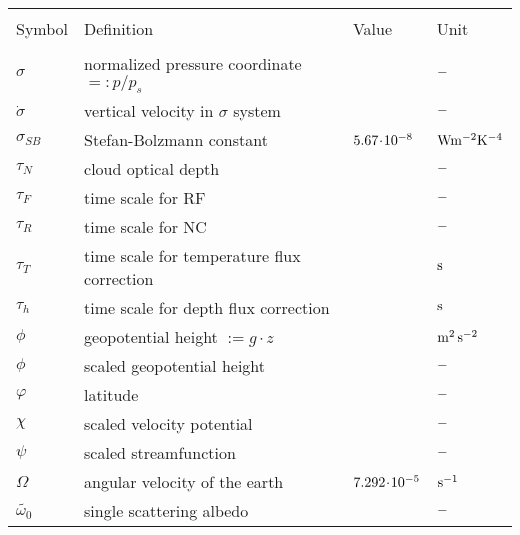 \begin{tabular*}{\textwidth}{|l@{\extracolsep\fill}lll|}
\hline
\vspace{-3mm} & & & \\
Symbol         & Definition                       & Value   & Unit \\
\hline 
\vspace{-3mm} & & & \\
$\sigma$  & normalized pressure coordinate $=: p/p_s$       &         & $\rm -$ \\
$\dot{\sigma}$  & vertical velocity in $\sigma$ system           &         & $\rm -$ \\
$\sigma_{SB}$ & Stefan-Bolzmann constant & $ 5.67 \! \cdot \! 10^{-8}$ &$\rm W m^{-2}K^{-4}$ \\
$\tau_N$  & cloud optical depth    &    &$\rm  -$\\
$\tau_{F}$     & time scale for RF                     &         & $\rm -$ \\
$\tau_{R}$     & time scale for NC                     &         & $\rm -$ \\
$\tau_{T}$     & time scale for temperature flux correction      &         & $\rm s$ \\
$\tau_{h}$     & time scale for depth flux correction            &         & $\rm s$ \\

$\phi$         & geopotential height $:=g\cdot{z}$          &         & $\rm m^2\,
s^{-2}$ \\
$\phi$         & scaled geopotential height            &         & $\rm -$ \\
$\varphi$      & latitude                                   &         & $\rm -$ \\

$\chi$    & scaled velocity potential                  &         & $\rm -$ \\

$\psi$         & scaled streamfunction                      &         & $\rm -$ \\
$\Omega$  & angular velocity of the earth              & $\rm 7.292\! \cdot \! 10^{-5}$ & $\rm
s^{-1}$ \\
$\tilde{\omega_0}$ & single scattering albedo     &    &$\rm- $\\

\hline
\end{tabular*}

